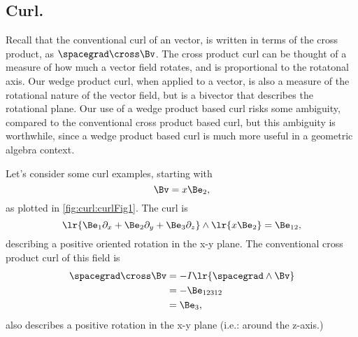 %
%
\subsection{Curl.}
Recall that the conventional curl of an  vector, is written in terms of the cross product, as \( \spacegrad \cross \Bv \).  The cross product curl can be thought of a measure of how much a vector field rotates, and is proportional to the rotatonal axis.  Our wedge product curl, when applied to a vector, is also a measure of the rotational nature of the vector field, but is a bivector that describes the rotational plane.
Our use of a wedge product based curl risks some ambiguity, compared to the conventional  cross product based curl, but this ambiguity is worthwhile, since a wedge product based curl is much more useful in a geometric algebra context.

Let's consider some curl examples, starting with
\begin{equation}\label{eqn:vectorcalc:1030}
\Bv = x \Be_2,
\end{equation}
as plotted in \cref{fig:curl:curlFig1}.
The curl is
\begin{equation}\label{eqn:vectorcalc:1050}
\lr{ \Be_1 \partial_x + \Be_2 \partial_y + \Be_3 \partial_z } \wedge \lr{ x \Be_2 }
=
\Be_{12},
\end{equation}
describing a positive oriented rotation in the x-y plane.
The conventional cross product curl of this field is
\begin{equation}\label{eqn:vectorcalc:1070}
\begin{aligned}
\spacegrad \cross \Bv
&= -I \lr{ \spacegrad \wedge \Bv }  \\
&= - \Be_{12312}  \\
&= \Be_3,
\end{aligned}
\end{equation}
also describes a positive rotation in the x-y plane (i.e.: around the z-axis.)

